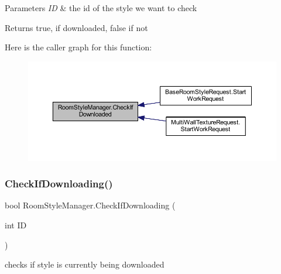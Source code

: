 \begin{DoxyParams}{Parameters}
{\em ID} & the id of the style we want to check\\
\hline
\end{DoxyParams}
\begin{DoxyReturn}{Returns}
true, if downloaded, false if not
\end{DoxyReturn}
Here is the caller graph for this function\+:
\nopagebreak
\begin{figure}[H]
\begin{center}
\leavevmode
\includegraphics[width=350pt]{class_room_style_manager_a4cc11d2cbbe1a94def12775722d64b74_icgraph}
\end{center}
\end{figure}
\mbox{\label{class_room_style_manager_aab9bdbc810904cb623cddcb636165a6a}} 
\subsubsection{\texorpdfstring{Check\+If\+Downloading()}{CheckIfDownloading()}}
{\footnotesize\ttfamily bool Room\+Style\+Manager.\+Check\+If\+Downloading (\begin{DoxyParamCaption}\item[{int}]{ID }\end{DoxyParamCaption})}



checks if style is currently being downloaded 


